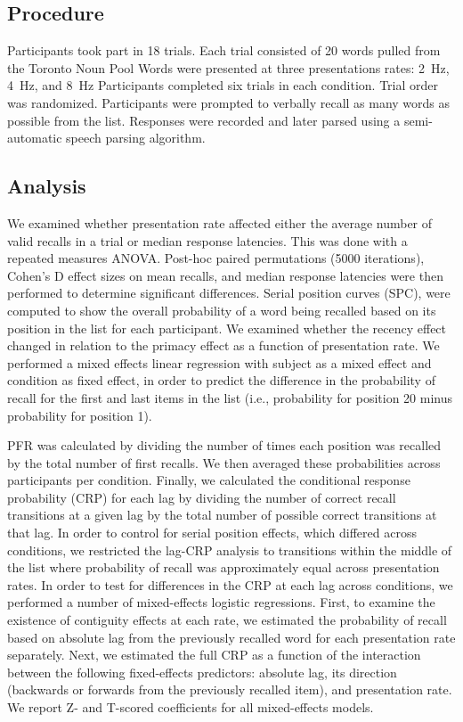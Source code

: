 \documentclass[10pt,letterpaper]{article}
\begin{document}
\subsection{Procedure}

Participants took part in 18 trials. Each trial consisted of 20 words pulled from the Toronto Noun Pool \cite{FrieEtal82} 
Words were presented at three
presentations rates: 2~Hz, 4~Hz, and 8~Hz Participants completed six trials in
each condition. Trial order was randomized.  Participants were prompted to
verbally recall as many words as possible from the list. Responses were
recorded and later parsed using a semi-automatic speech parsing algorithm.

\subsection{Analysis}

We examined whether presentation rate affected either the average number of
valid recalls in a trial or median response latencies. This was done with a
repeated measures ANOVA. Post-hoc paired permutations (5000 iterations),
Cohen's D effect sizes on mean recalls, and median response latencies were then
performed to determine significant differences. Serial position curves (SPC),
were computed to show the overall probability of a word being recalled based
on its position in the list for each participant. We examined whether the recency
effect changed in relation to the primacy effect as a function of presentation
rate. We performed a mixed effects linear regression with subject as a mixed
effect and condition as fixed effect, in order to predict the difference in
the probability of recall for the first and last items in the list (i.e.,
probability for position 20 minus probability for position 1). 

PFR was calculated by dividing the number of times each position was recalled
by the total number of first recalls. We then averaged these probabilities
across participants per condition. Finally, we calculated the conditional
response probability (CRP) for each lag by dividing the number of correct
recall transitions at a given lag by the total number of possible correct
transitions at that lag. 
In order to control for serial position effects, which differed across
conditions, we restricted the lag-CRP analysis to transitions within the
middle of the list where probability of recall was approximately equal across
presentation rates.
In order to test for differences in the CRP at each
lag across conditions, we performed a number of mixed-effects logistic regressions. 
First, to examine the existence of contiguity effects at each rate,
we estimated the probability of recall based on absolute lag from the previously
recalled word for each presentation rate separately. Next, we estimated the full CRP as a function of the
interaction between the following fixed-effects predictors: absolute lag, its
direction (backwards or forwards from the previously recalled item), and 
presentation rate. We report Z- and T-scored coefficients for all
mixed-effects models.
\end{document}
